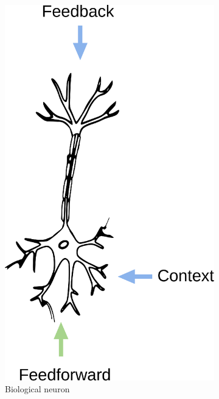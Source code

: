 \begin{figure}[H]
\begin{subfigure}[b]{0.35\linewidth}
        \includegraphics[width=\linewidth]{resources/related_works/neuron_biological}
        \caption{Biological neuron}
    \end{subfigure}
    \hfill
    \begin{subfigure}[b]{0.55\linewidth}
        \centering

\end{subfigure}
\end{figure}
